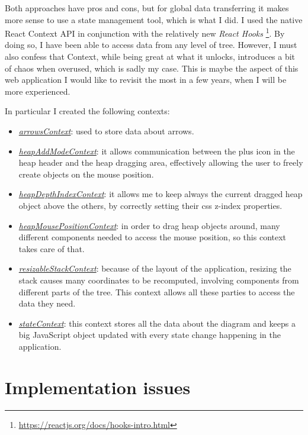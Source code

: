 \documentclass[]{usiinfbachelorproject}
\begin{document}
\noindent Both approaches have pros and cons, but for global data transferring it makes more sense to use a state management tool, which is what I did. I used the native React Context API in conjunction with the relatively new \emph{React Hooks} \footnote{\url{https://reactjs.org/docs/hooks-intro.html}}. By doing so, I have been able to access data from any level of tree. However, I must also confess that Context, while being great at what it unlocks, introduces a bit of chaos when overused, which is sadly my case. This is maybe the aspect of this web application I would like to revisit the most in a few years, when I will be more experienced.

\vspace{\fill}

\pagebreak

\noindent In particular I created the following contexts:

\begin{itemize}
	\item \ul{\emph{arrowsContext}}: used to store data about arrows.
	\item \ul{\emph{heapAddModeContext}}: it allows communication between the plus icon in the heap header and the heap dragging area, effectively allowing the user to freely create objects on the mouse position.
	\item \ul{\emph{heapDepthIndexContext}}: it allows me to keep always the current dragged heap object above the others, by correctly setting their css z-index properties.
	\item \ul{\emph{heapMousePositionContext}}: in order to drag heap objects around, many different components needed to access the mouse position, so this context takes care of that.
	\item \ul{\emph{resizableStackContext}}: because of the layout of the application, resizing the stack causes many coordinates to be recomputed, involving components from different  parts of the tree. This context allows all these parties to access the data they need.
	\item \ul{\emph{stateContext}}: this context stores all the data about the diagram and keeps a big JavaScript object updated with every state change happening in the application.
\end{itemize}

\vspace{\fill}

\pagebreak

\section{Implementation issues} \label{issues}
\end{document}
